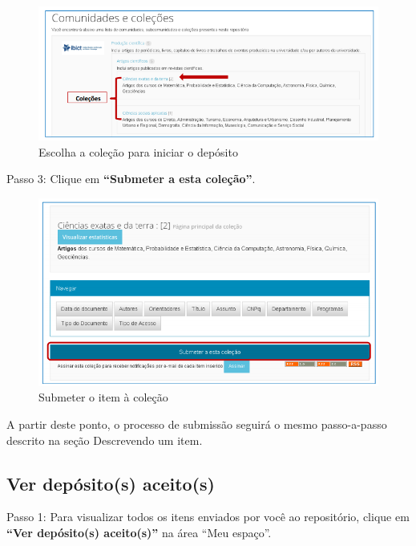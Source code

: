 \documentclass[12pt,hidelinks]{article}
\begin{document}
    \begin{figure}[!htp]
                \centering
                \includegraphics[scale=0.8]{figura/Figura164.png}
                \caption{Escolha a coleção para iniciar o depósito}
            \label{Rotulo}
        \end{figure}
    
    Passo 3: Clique em \textbf{“Submeter a esta coleção”}.
    
    \begin{figure}[!htp]
                \centering
                \includegraphics[scale=0.8]{figura/Figura165.png}
                \caption{Submeter o item à coleção}
            \label{Rotulo}
        \end{figure}
    
    A partir deste ponto, o processo de submissão seguirá o mesmo passo-a-passo descrito na seção Descrevendo um item. 
    
    \subsection{Ver depósito(s) aceito(s)}
    
    Passo 1: Para visualizar todos os itens enviados por você ao repositório, clique em \textbf{“Ver depósito(s) aceito(s)”} na área “Meu espaço”.
    
\end{document}
